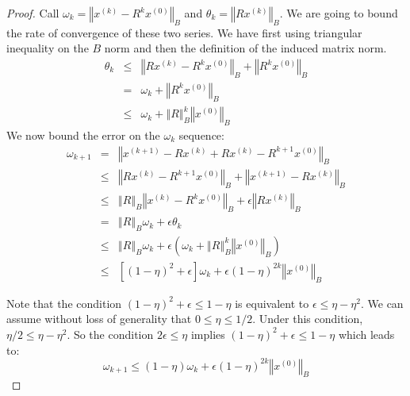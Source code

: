 \begin{proof} Call $\omega_{k}=\left\Vert x^{\left(k\right)}-R^{k}x^{\left(0\right)}\right\Vert _{B}$
and $\theta_{k}=\left\Vert Rx^{\left(k\right)}\right\Vert _{B}$.
We are going to bound the rate of convergence of these two series.
We have first using triangular inequality on the $B$ norm and then
the definition of the induced matrix norm. 
\begin{eqnarray*}
\theta_{k} & \leq & \left\Vert Rx^{\left(k\right)}-R^{k}x^{\left(0\right)}\right\Vert _{B}+\left\Vert R^{k}x^{\left(0\right)}\right\Vert _{B}\\
 & = & \omega_{k}+\left\Vert R^{k}x^{\left(0\right)}\right\Vert _{B}\\
 & \leq & \omega_{k}+\left\Vert R\right\Vert _{B}^{k}\left\Vert x^{\left(0\right)}\right\Vert _{B}
\end{eqnarray*}
We now bound the error on the $\omega_{k}$ sequence: 
\begin{eqnarray*}
\omega_{k+1} & = & \left\Vert x^{\left(k+1\right)}-Rx^{\left(k\right)}+Rx^{\left(k\right)}-R^{k+1}x^{\left(0\right)}\right\Vert _{B}\\
 & \leq & \left\Vert Rx^{\left(k\right)}-R^{k+1}x^{\left(0\right)}\right\Vert _{B}+\left\Vert x^{\left(k+1\right)}-Rx^{\left(k\right)}\right\Vert _{B}\\
 & \leq & \left\Vert R\right\Vert _{B}\left\Vert x^{\left(k\right)}-R^{k}x^{\left(0\right)}\right\Vert _{B}+\epsilon\left\Vert Rx^{\left(k\right)}\right\Vert _{B}\\
 & = & \left\Vert R\right\Vert _{B}\omega_{k}+\epsilon\theta_{k}\\
 & \leq & \left\Vert R\right\Vert _{B}\omega_{k}+\epsilon\left(\omega_{k}+\left\Vert R\right\Vert _{B}^{k}\left\Vert x^{\left(0\right)}\right\Vert _{B}\right)\\
 & \leq & \left[\left(1-\eta\right)^{2}+\epsilon\right]\omega_{k}+\epsilon\left(1-\eta\right)^{2k}\left\Vert x^{\left(0\right)}\right\Vert _{B}
\end{eqnarray*}


Note that the condition $\left(1-\eta\right)^{2}+\epsilon\leq1-\eta$
is equivalent to $\epsilon\leq\eta-\eta^{2}$. We can assume without
loss of generality that $0\leq\eta\leq1/2$. Under this condition,
$\eta/2\leq\eta-\eta^{2}$. So the condition $2\epsilon\leq\eta$
implies $\left(1-\eta\right)^{2}+\epsilon\leq1-\eta$ which leads
to: 
\[
\omega_{k+1}\leq\left(1-\eta\right)\omega_{k}+\epsilon\left(1-\eta\right)^{2k}\left\Vert x^{\left(0\right)}\right\Vert _{B}
\]



\end{proof}
